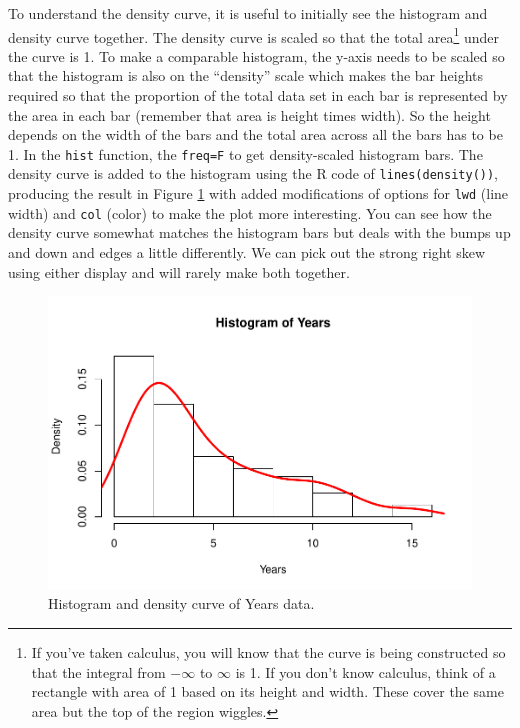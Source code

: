 \documentclass[]{book}
\newenvironment{Shaded}{\begin{snugshade}}{\end{snugshade}}
\newcommand{\KeywordTok}[1]{\textcolor[rgb]{0.13,0.29,0.53}{\textbf{{#1}}}}
\newcommand{\DataTypeTok}[1]{\textcolor[rgb]{0.13,0.29,0.53}{{#1}}}
\newcommand{\DecValTok}[1]{\textcolor[rgb]{0.00,0.00,0.81}{{#1}}}
\newcommand{\StringTok}[1]{\textcolor[rgb]{0.31,0.60,0.02}{{#1}}}
\newcommand{\NormalTok}[1]{{#1}}
\let\rmarkdownfootnote\footnote%
\def\footnote{\protect\rmarkdownfootnote}
\begin{document}
To understand the density curve, it is useful to initially see the
histogram and density curve together. The density curve is scaled so
that the total area\footnote{If you've taken calculus, you will know
  that the curve is being constructed so that the integral from
  \(-\infty\) to \(\infty\) is 1. If you don't know calculus, think of a
  rectangle with area of 1 based on its height and width. These cover
  the same area but the top of the region wiggles.} under the curve is
1. To make a comparable histogram, the y-axis needs to be scaled so that
the histogram is also on the ``density'' scale which makes the bar
heights required so that the proportion of the total data set in each
bar is represented by the area in each bar (remember that area is height
times width). So the height depends on the width of the bars and the
total area across all the bars has to be 1. In the \texttt{hist}
function, the \texttt{freq=F} to get density-scaled histogram bars. The
density curve is added to the histogram using the R code of
\texttt{lines(density())}, producing the result in Figure
\ref{fig:Figure2-2} with added modifications of options for \texttt{lwd}
(line width) and \texttt{col} (color) to make the plot more interesting.
You can see how the density curve somewhat matches the histogram bars
but deals with the bumps up and down and edges a little differently. We
can pick out the strong right skew using either display and will rarely
make both together.



\begin{Shaded}
\end{Shaded}

\begin{figure}[htbp]
\centering
\includegraphics{GreenwoodBanner_files/figure-latex/Figure2-2-1.pdf}
\caption{\label{fig:Figure2-2}Histogram and density curve of Years data.}
\end{figure}
\end{document}
